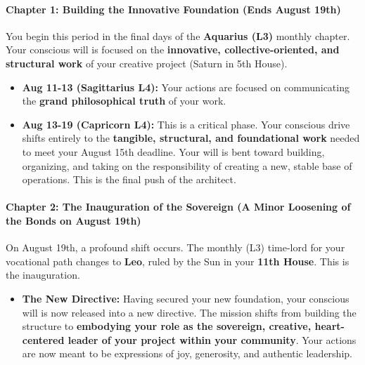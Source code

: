 \documentclass{article}
\begin{document}
\paragraph*{Chapter 1: Building the Innovative Foundation (Ends August 19th)}\label{chapter-1-building-the-innovative-foundation-ends-august-19th}

You begin this period in the final days of the \textbf{Aquarius (L3)} monthly chapter. Your conscious will is focused on the \textbf{innovative, collective-oriented, and structural work} of your creative project (Saturn in 5th House).

\begin{itemize}
\item
  \textbf{Aug 11-13 (Sagittarius L4):} Your actions are focused on communicating the \textbf{grand philosophical truth} of your work.
\item
  \textbf{Aug 13-19 (Capricorn L4):} This is a critical phase. Your conscious drive shifts entirely to the \textbf{tangible, structural, and foundational work} needed to meet your August 15th deadline. Your will is bent toward building, organizing, and taking on the responsibility of creating a new, stable base of operations. This is the final push of the architect.
\end{itemize}

\paragraph*{Chapter 2: The Inauguration of the Sovereign (A Minor Loosening of the Bonds on August 19th)}\label{chapter-2-the-inauguration-of-the-sovereign-a-minor-loosening-of-the-bonds-on-august-19th}

On August 19th, a profound shift occurs. The monthly (L3) time-lord for your vocational path changes to \textbf{Leo}, ruled by the Sun in your \textbf{11th House}. This is the inauguration.

\begin{itemize}
\tightlist
\item
  \textbf{The New Directive:} Having secured your new foundation, your conscious will is now released into a new directive. The mission shifts from building the structure to \textbf{embodying your role as the sovereign, creative, heart-centered leader of your project within your community}. Your actions are now meant to be expressions of joy, generosity, and authentic leadership.
\end{itemize}
\end{document}
